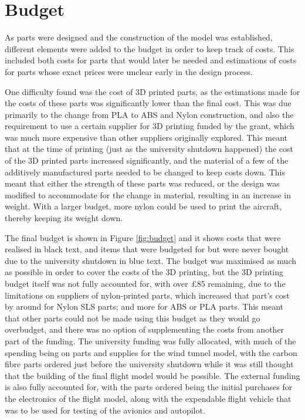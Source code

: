 \documentclass[../../main.tex]{subfiles}
\begin{document}
\section{Budget} \label{sec:project-review:budget}

As parts were designed and the construction of the model was established, different elements were added to the budget in order to keep track of costs.
This included both costs for parts that would later be needed and estimations of costs for parts whose exact prices were unclear early in the design process.

One difficulty found was the cost of 3D printed parts, as the estimations made for the costs of these parts was significantly lower than the final cost.
This was due primarily to the change from PLA to ABS and Nylon construction, and also the requirement to use a certain supplier for 3D printing funded by the grant, which was much more expensive than other suppliers originally explored.
This meant that at the time of printing (just as the university shutdown happened) the cost of the 3D printed parts increased significantly, and the material of a few of the additively manufactured parts needed to be changed to keep costs down.
This meant that either the strength of these parts was reduced, or the design was modified to accommodate for the change in material, resulting in an increase in weight.
With a larger budget, more nylon could be used to print the aircraft, thereby keeping its weight down. 


The final budget is shown in Figure \ref{fig:budget} and it shows costs that were realised in black text, and items that were budgeted for but were never bought due to the university shutdown in blue text.
The budget was maximised as much as possible in order to cover the costs of the 3D printing, but the 3D printing budget itself was not fully accounted for, with over £85 remaining, due to the limitations on suppliers of nylon-printed parts, which increased that part's cost by around  for Nylon SLS parts; and more for ABS or PLA parts.
This meant that other parts could not be made using this budget as they would go overbudget, and there was no option of supplementing the costs from another part of the funding.
The university funding was fully allocated, with much of the spending being on parts and supplies for the wind tunnel model, with the carbon fibre parts ordered just before the university shutdown while it was still thought that the building of the final flight model would be possible.
The external funding is also fully accounted for, with the parts ordered being the initial purchases for the electronics of the flight model, along with the expendable flight vehicle that was to be used for testing of the avionics and autopilot. 
\end{document}
